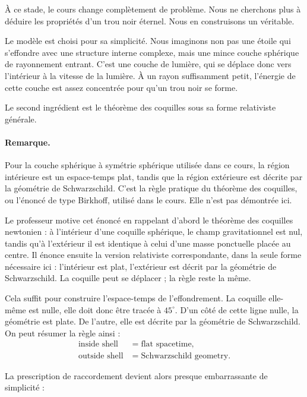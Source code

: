 À ce stade, le cours change complètement de problème. Nous ne cherchons plus à déduire les propriétés d’un trou noir éternel. Nous en construisons un véritable.

Le modèle est choisi pour sa simplicité. Nous imaginons non pas une étoile qui s’effondre avec une structure interne complexe, mais une mince couche sphérique de rayonnement entrant. C’est une couche de lumière, qui se déplace donc vers l’intérieur à la vitesse de la lumière. À un rayon suffisamment petit, l’énergie de cette couche est assez concentrée pour qu’un trou noir se forme.

Le second ingrédient est le théorème des coquilles sous sa forme relativiste générale.

\paragraph{Remarque.} Pour la couche sphérique à symétrie sphérique utilisée dans ce cours, la région intérieure est un espace-temps plat, tandis que la région extérieure est décrite par la géométrie de Schwarzschild. C’est la règle pratique du théorème des coquilles, ou l’énoncé de type Birkhoff, utilisé dans le cours. Elle n’est pas démontrée ici.

Le professeur motive cet énoncé en rappelant d’abord le théorème des coquilles newtonien : à l’intérieur d’une coquille sphérique, le champ gravitationnel est nul, tandis qu’à l’extérieur il est identique à celui d’une masse ponctuelle placée au centre. Il énonce ensuite la version relativiste correspondante, dans la seule forme nécessaire ici : l’intérieur est plat, l’extérieur est décrit par la géométrie de Schwarzschild. La coquille peut se déplacer ; la règle reste la même.

Cela suffit pour construire l’espace-temps de l’effondrement. La coquille elle-même est nulle, elle doit donc être tracée à \(45^\circ\). D’un côté de cette ligne nulle, la géométrie est plate. De l’autre, elle est décrite par la géométrie de Schwarzschild. On peut résumer la règle ainsi :
\begin{equation}
\begin{aligned}
\text{inside shell} &= \text{flat spacetime},\\
\text{outside shell} &= \text{Schwarzschild geometry}.
\end{aligned}
\end{equation}

La prescription de raccordement devient alors presque embarrassante de simplicité :

